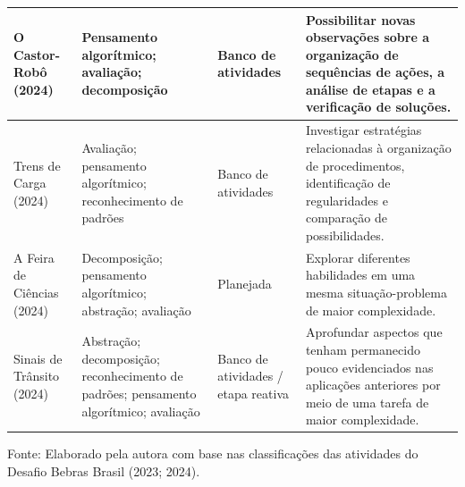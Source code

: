{\begin{xltabular}{\textwidth}{
    |>{\raggedright\arraybackslash}p{2.7cm}
    |>{\raggedright\arraybackslash}p{3.5cm}
    |>{\raggedright\arraybackslash}p{2.4cm}
    |>{\raggedright\arraybackslash}X|}
    O Castor-Robô (2024) &
    Pensamento algorítmico; avaliação; decomposição &
    Banco de atividades &
    Possibilitar novas observações sobre a organização de sequências de ações, a análise de etapas e a verificação de soluções. \\
    \hline

    Trens de Carga (2024) &
    Avaliação; pensamento algorítmico; reconhecimento de padrões &
    Banco de atividades &
    Investigar estratégias relacionadas à organização de procedimentos, identificação de regularidades e comparação de possibilidades. \\
    \hline

    A Feira de Ciências (2024) &
    Decomposição; pensamento algorítmico; abstração; avaliação &
    Planejada &
    Explorar diferentes habilidades em uma mesma situação-problema de maior complexidade. \\
    \hline

    Sinais de Trânsito (2024) &
    Abstração; decomposição; reconhecimento de padrões; pensamento algorítmico; avaliação &
    Banco de atividades / etapa reativa &
    Aprofundar aspectos que tenham permanecido pouco evidenciados nas aplicações anteriores por meio de uma tarefa de maior complexidade. \\
    \hline

\end{xltabular}
\addtocounter{table}{-1}

\vspace{1mm}

\begin{flushleft}
    \footnotesize
    Fonte: Elaborado pela autora com base nas classificações das atividades do Desafio Bebras Brasil (2023; 2024).
\end{flushleft}
}
\FloatBarrier




